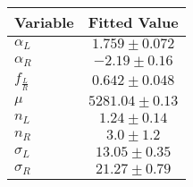 \begin{tabular}[t]{lc}
\hline
Variable &Fitted Value\\
\hline\hline
$\alpha_L$&$1.759\pm0.072$\\
\hline
$\alpha_R$&$-2.19\pm0.16$\\
\hline
$f_{\frac{L}{R}}$&$0.642\pm0.048$\\
\hline
$\mu$&$5281.04\pm0.13$\\
\hline
$n_L$&$1.24\pm0.14$\\
\hline
$n_R$&$3.0\pm1.2$\\
\hline
$\sigma_L$&$13.05\pm0.35$\\
\hline
$\sigma_R$&$21.27\pm0.79$\\
\hline
\end{tabular}